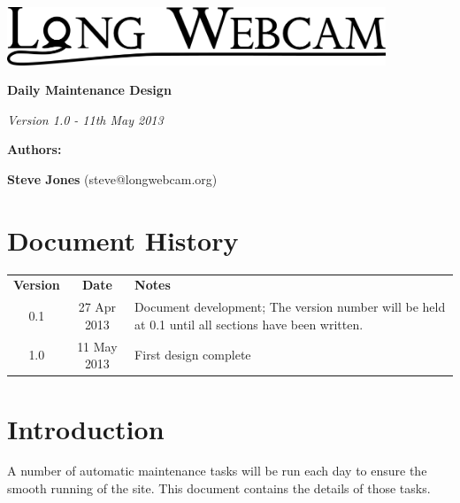 \documentclass[11pt]{article}
\begin{document}
\begin{titlepage}
\begin{center}

\includegraphics[width=0.85\textwidth]{./Logo_Large-cropped_black.png}

\vspace{3 cm}

\textbf{\Huge{Daily Maintenance Design}}

\vspace{1 cm}

\textit{\large{Version 1.0 - 11th May 2013}}

\vspace{4 cm}

\textbf{\Large{Authors:}}

\textbf{Steve Jones} (steve@longwebcam.org)

\end{center}

\end{titlepage}

\setcounter{tocdepth}{2}
\tableofcontents
\clearpage
{}
\section*{Document History}
\begin{table}[tbhp!]
\begin{tabular}{ c c p{4in} }
\textbf{Version} & \textbf{Date} & \textbf{Notes} \\
0.1 & 27 Apr 2013 & Document development; The version number will be held at 0.1 until all sections have been written. \\
1.0 & 11 May 2013 & First design complete \\
\end{tabular}
\end{table}

\clearpage
{}

\section{Introduction}
A number of automatic maintenance tasks will be run each day to ensure the smooth running of the site. This document contains the details of those tasks.
\end{document}
